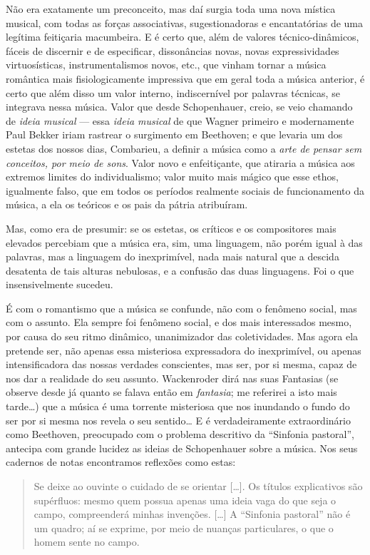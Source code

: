 Não era exatamente um preconceito, mas daí surgia toda uma nova mística
musical, com todas as forças associativas, sugestionadoras e
encantatórias de uma legítima feitiçaria macumbeira. E é certo que, além
de valores técnico-dinâmicos, fáceis de discernir e de especificar,
dissonâncias novas, novas expressividades virtuosísticas,
instrumentalismos novos, etc., que vinham tornar a música romântica mais
fisiologicamente impressiva que em geral toda a música anterior, é certo
que além disso um valor interno, indiscernível por palavras técnicas, se
integrava nessa música. Valor que desde Schopenhauer, creio, se veio
chamando de \textit{ideia musical} --- essa \textit{ideia musical} de que Wagner
primeiro e modernamente Paul Bekker iriam rastrear o surgimento em
Beethoven; e que levaria um dos estetas dos nossos dias, Combarieu, a
definir a música como a \textit{arte de pensar sem conceitos, por meio de
sons}. Valor novo e enfeitiçante, que atiraria a música aos extremos
limites do individualismo; valor muito mais mágico que esse ethos,
igualmente falso, que em todos os períodos realmente sociais de
funcionamento da música, a ela os teóricos e os pais da pátria
atribuíram.

Mas, como era de presumir: se os estetas, os críticos e os compositores
mais elevados percebiam que a música era, sim, uma linguagem, não porém
igual à das palavras, mas a linguagem do inexprimível, nada mais natural
que a descida desatenta de tais alturas nebulosas, e a confusão das duas
linguagens. Foi o que insensivelmente sucedeu.

É com o romantismo que a música se confunde, não com o fenômeno social,
mas com o assunto. Ela sempre foi fenômeno social, e dos mais
interessados mesmo, por causa do seu ritmo dinâmico, unanimizador das
coletividades. Mas agora ela pretende ser, não apenas essa misteriosa
expressadora do inexprimível, ou apenas intensificadora das nossas
verdades conscientes, mas ser, por si mesma, capaz de nos dar a
realidade do seu assunto. Wackenroder dirá nas suas Fantasias (se
observe desde já quanto se falava então em \textit{fantasia}; me referirei a
isto mais tarde\ldots{}) que a música é uma torrente misteriosa que nos
inundando o fundo do ser por si mesma nos revela o seu sentido\ldots{} E é
verdadeiramente extraordinário como Beethoven, preocupado com o problema
descritivo da ``Sinfonia pastoral'', antecipa com grande lucidez as
ideias de Schopenhauer sobre a música. Nos seus cadernos de notas
encontramos reflexões como estas:

\begin{quote}
Se deixe ao ouvinte o cuidado de se orientar {[}\ldots{}{]}. Os títulos
explicativos são supérfluos: mesmo quem possua apenas uma ideia vaga do
que seja o campo, compreenderá minhas invenções. {[}\ldots{}{]} A ``Sinfonia
pastoral'' não é um quadro; aí se exprime, por meio de nuanças
particulares, o que o homem sente no campo.
\end{quote}

